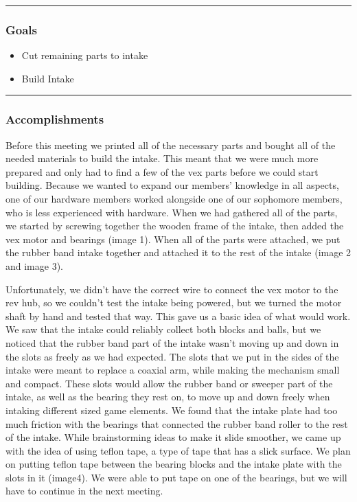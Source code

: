 \noindent\hfil\rule{\textwidth}{.4pt}\hfil
\subsubsection*{Goals}
\begin{itemize}
    \item Cut remaining parts to intake
    \item Build Intake 

\end{itemize} 

\noindent\hfil\rule{\textwidth}{.4pt}\hfil

\subsubsection*{Accomplishments}
Before this meeting we printed all of the necessary parts and bought all of the needed materials to build the intake. This meant that we were much more prepared and only had to find a few of the vex parts before we could start building. Because we wanted to expand our members’ knowledge in all aspects, one of our hardware members worked alongside one of our sophomore members, who is less experienced with hardware. When we had gathered all of the parts, we started by screwing together the wooden frame of the intake, then added the vex motor and bearings (image 1). When all of the parts were attached, we put the rubber band intake together and attached it to the rest of the intake (image 2 and image 3). 

Unfortunately, we didn't have the correct wire to connect the vex motor to the rev hub, so we couldn’t test the intake being powered, but we turned the motor shaft by hand and tested that way. This gave us a basic idea of what would work. We saw that the intake could reliably collect both blocks and balls, but we noticed that the rubber band part of the intake wasn’t moving up and down in the slots as freely as we had expected. The slots that we put in the sides of the intake were meant to replace a coaxial arm, while making the mechanism small and compact. These slots would allow the rubber band or sweeper part of the intake, as well as the bearing they rest on, to move up and down freely when intaking different sized game elements. We found that the intake plate  had too much friction with the bearings that connected the rubber band roller to the rest of the intake. While brainstorming ideas to make it slide smoother, we came up with the idea of using teflon tape, a type of tape that has a slick surface. We plan on putting teflon tape between the bearing blocks and the intake plate with the slots in it (image4). We were able to put tape on one of the bearings, but we will have to continue in the next meeting. 

